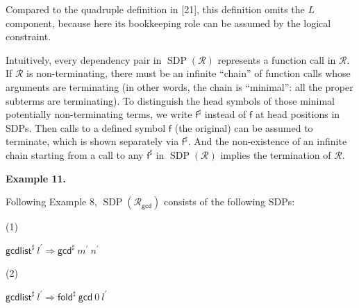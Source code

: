 \documentclass[10pt,a4paper]{amsart}
\begin{document}
 
 
 
Compared to the quadruple definition in [21], this definition omits the $L$ component, because here its bookkeeping role can be assumed by the logical constraint.\par
 
 
 
Intuitively, every dependency pair in $\operatorname{SDP}(\mathcal{R})$ represents a function call in $\mathcal{R}$. If $\mathcal{R}$ is non-terminating, there must be an infinite “chain” of function calls whose arguments are terminating (in other words, the chain is “minimal”: all the proper subterms are terminating). To distinguish the head symbols of those minimal potentially non-terminating terms, we write $\mathsf{f}^{\sharp}$ instead of $\mathsf{f}$ at head positions in SDPs. Then calls to a defined symbol $\mathsf{f}$ (the original) can be assumed to terminate, which is shown separately via $\mathsf{f}^{\sharp}$. And the non-existence of an infinite chain starting from a call to any $\mathsf{f}^{\sharp}$ in $\operatorname{SDP}(\mathcal{R})$ implies the termination of $\mathcal{R}$.\par
 
 
 
\par\medskip\noindent\textbf{Example 11.}\par
 
 
Following Example 8, $\operatorname{SDP}(\mathcal{R}_{\mathsf{gcd}})$ consists of the following SDPs:\par
  
\par\noindent  (1) 
 
${{\mathsf{gcdlist}^{\sharp}}\ {l^{\prime}}}\Rightarrow{{{\mathsf{gcd}^{\sharp}}\ {m^{\prime}}}\ {n^{\prime}}}$\par
 
 
 
\par\noindent  (2) 
 
${{\mathsf{gcdlist}^{\sharp}}\ {l^{\prime}}}\Rightarrow{{{{\mathsf{fold}^{\sharp}}\ {\mathsf{gcd}}}\ {0}}\ {l^{\prime}}}$\par
 
\end{document}

